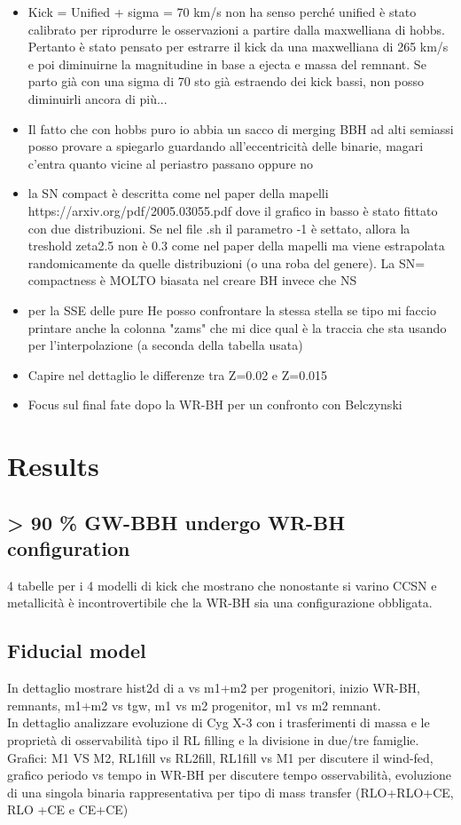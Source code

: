 \documentclass[a4paper,titlepage]{book}     	%
\begin{document}
\begin{itemize}
	\item Kick = Unified + sigma = 70 km/s non ha senso perché unified è stato calibrato per riprodurre le osservazioni a partire dalla maxwelliana di hobbs. Pertanto è stato pensato per estrarre il kick da una maxwelliana di 265 km/s e poi diminuirne la magnitudine in base a ejecta e massa del remnant. Se parto già con una sigma di 70 sto già estraendo dei kick bassi, non posso diminuirli ancora di più...
	\item Il fatto che con hobbs puro io abbia un sacco di merging BBH ad alti semiassi posso provare a spiegarlo guardando all'eccentricità delle binarie, magari c'entra quanto vicine al periastro passano oppure no
	\item la SN compact è descritta come nel paper della mapelli https://arxiv.org/pdf/2005.03055.pdf dove il grafico in basso è stato fittato con due distribuzioni. Se nel file .sh il parametro -1 è settato, allora la treshold zeta2.5 non è 0.3 come nel paper della mapelli ma viene estrapolata randomicamente da quelle distribuzioni (o una roba del genere). La SN= compactness è MOLTO biasata nel creare BH invece che NS
	\item per la SSE delle pure He posso confrontare la stessa stella se tipo mi faccio printare anche la colonna "zams" che mi dice qual è la traccia che sta usando per l'interpolazione (a seconda della tabella usata)
	\item Capire nel dettaglio le differenze tra Z=0.02 e Z=0.015
	\item Focus sul final fate dopo la WR-BH per un confronto con Belczynski
\end{itemize}







\chapter{Results}\label{sec:results}
\section{> 90 \% GW-BBH undergo WR-BH configuration}
4 tabelle per i 4 modelli di kick che mostrano che nonostante si varino CCSN e metallicità è incontrovertibile che la WR-BH sia una configurazione obbligata.

\section{Fiducial model}
In dettaglio mostrare hist2d di a vs m1+m2 per progenitori, inizio WR-BH, remnants, m1+m2 vs tgw, m1 vs m2 progenitor, m1 vs m2 remnant.\\
In dettaglio analizzare evoluzione di Cyg X-3 con i trasferimenti di massa e le proprietà di osservabilità tipo il RL filling e la divisione in due/tre famiglie. Grafici: M1 VS M2, RL1fill vs RL2fill, RL1fill vs M1 per discutere il wind-fed, grafico periodo vs tempo in WR-BH per discutere tempo osservabilità, evoluzione di una singola binaria rappresentativa per tipo di mass transfer (RLO+RLO+CE, RLO +CE e CE+CE)
\end{document}
